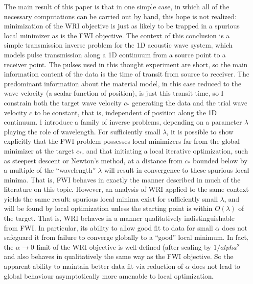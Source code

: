 The main result of this paper is that in one simple case, in which all
of the necessary computations can be carried out by hand, this hope is
not realized: minimization of the WRI objective is just as likely to
be trapped in a spurious local minimizer as is the FWI objective.  The
context of this conclusion is a simple transmission inverse problem
for the 1D acoustic wave system, which models pulse transmission along
a 1D continuum from a source point to a receiver point. The pulses
used in this thought experiment are short, so the main information
content of the data is the time of transit from source to
receiver. The predominant information about the material model, in
this case reduced to the wave velocity (a scalar function of
position), is just this transit time, so I constrain both the target
wave velocity $c_*$ generating the data and the trial wave velocity
$c$ to be constant, that is, independent of position along the 1D
continuum. I introduce a family of inverse problems, depending on a
parameter $\lambda$ playing the role of wavelength. For sufficiently small
$\lambda$, it is possible to show explicitly that the FWI problem
possesses local minimizers far from the global minimizer at the target
$c_*$, and that initiating a local iterative optimization, such as
steepest descent or Newton's method, at a distance from $c_*$ bounded
below by a multiple of the ``wavelength'' $\lambda$ will result in
convergence to these spurious local minima. That is, FWI 
behaves in exactly the manner described in much of the literature on
this topic. However, an analysis of WRI applied to the same context
yields the same result: spurious local minima exist for sufficiently
small $\lambda$, and will be found by local optimization unless the
starting point is within $O(\lambda)$ of the target. That is, WRI
behaves in a manner qualitatively indistinguishable from FWI. In
particular, its ability to allow good fit to data for small $\alpha$
does not safeguard it from failure to converge globally to a ``good''
local minimum. In fact, the $\alpha \rightarrow 0$ limit of the WRI
objective is well-defined (after scaling by $1/alpha^2$ and also behaves in
qualitatively the same way as the FWI objective. So the apparent
ability to maintain better data fit via reduction of $\alpha$ does not
lead to global behaviour asymptotically more amenable to local optimization.

